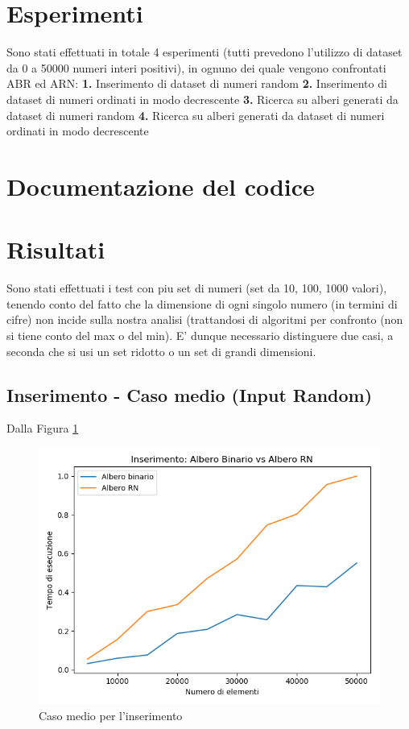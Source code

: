 \documentclass[a4paper]{article}
\begin{document}
\section{Esperimenti}
Sono stati effettuati in totale 4 esperimenti (tutti prevedono l'utilizzo di dataset da 0 a 50000 numeri interi positivi), in ognuno dei quale vengono confrontati ABR ed ARN:
\newline
\newline
\textbf{1.} Inserimento di dataset di numeri random 
\newline
\textbf{2.} Inserimento di dataset di numeri ordinati in modo decrescente 
\newline
\textbf{3.} Ricerca su alberi generati da dataset di numeri random
\newline
\textbf{4.} Ricerca su alberi generati da dataset di numeri ordinati in modo decrescente
\newline


\section{Documentazione del codice}
\newpage
\section{Risultati}
Sono stati effettuati i test con piu set di numeri (set da 10, 100, 1000 valori), tenendo conto del fatto che la dimensione di ogni singolo numero (in termini di cifre) non incide sulla nostra analisi (trattandosi di algoritmi per confronto (non si tiene conto del max o del min). E' dunque necessario distinguere due casi, a seconda che si usi un set ridotto o un set di grandi dimensioni. 
\subsection{Inserimento - Caso medio (Input Random)}
Dalla Figura \ref{fig:InsMedio} 	

 		\begin{figure}[!htb]
		\centering
		\includegraphics[scale=0.3]{Inserimentomedio}
		\caption{Caso medio per l'inserimento}
		\label{fig:InsMedio}
		\end{figure}
			
\end{document}
